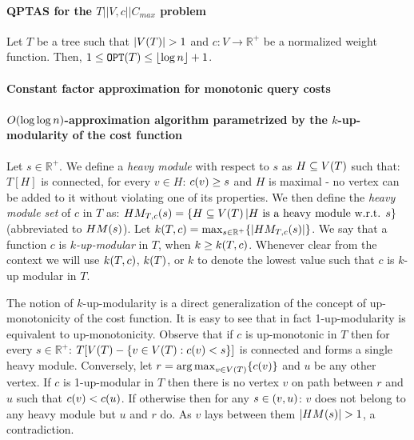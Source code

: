 \paragraph{QPTAS for the $T||V,c||C_{max}$ problem}
\begin{observation}\label{basicBoundsOnCost}
    Let $T$ be a tree such that $\spr{V\br{T}}> 1$ and $c:V\to \mathbb{R}^+$ be a normalized weight function. Then, $1\leq \texttt{OPT}(T) \leq \mathopen{}\left\lfloor \log n \right\rfloor+1$.
\end{observation}

\paragraph{Constant factor approximation for monotonic query costs}

\paragraph{$O\mathopen{}\left( \log\log n \right)$-approximation algorithm parametrized by the $k$-up-modularity of the cost function}

Let $s\in\mathbb{R}^+$. We define a \textit{heavy module} with respect to $s$ as $H\subseteq V\mathopen{}\left( T \right)$ such that: $T[H]$ is connected, for every $v \in H$: $c\mathopen{}\left( v \right)\geq s$ and $H$ is maximal - no vertex can be added to it without violating one of its properties. We then define the \textit{heavy module set} of $c$ in $T$ as: $HM_{T,c}\mathopen{}\left( s \right)=\mathopen{}\left\{ H\subseteq V\mathopen{}\left( T \right)|H \text{ is a heavy module w.r.t. } s \right\}$ (abbreviated to $HM\mathopen{}\left( s \right)$). Let $k\mathopen{}\left( T,c \right)= \max_{s\in\mathbb{R}^+}\mathopen{}\left\{ \mathopen{}\left| HM_{T,c}\mathopen{}\left( s \right) \right| \right\}$. We say that a function $c$ is $k$\textit{-up-modular} in $T$, when $k\geq k\mathopen{}\left( T,c \right)$. Whenever clear from the context we will use $k\mathopen{}\left( T,c \right)$, $k\mathopen{}\left( T \right)$, or $k$ to denote the lowest value such that $c$ is $k$-up modular in $T$. 

The notion of $k$-up-modularity is a direct generalization of the concept of up-monotonicity of the cost function. It is easy to see that in fact 1-up-modularity is equivalent to up-monotonicity. Observe that if $c$ is up-monotonic in $T$ then for every $s\in\mathbb{R}^+$: $T[V\mathopen{}\left( T \right)-\mathopen{}\left\{ v\in V\mathopen{}\left( T \right): c\mathopen{}\left( v \right)<s \right\}]$ is connected and forms a single heavy module. Conversely, let $r=\operatorname*{arg\,max}_{v\in V\mathopen{}\left( T \right)}\mathopen{}\left\{ c\mathopen{}\left( v \right) \right\}$ and $u$ be any other vertex. If $c$ is 1-up-modular in $T$ then there is no vertex $v$ on path between $r$ and $u$ such that $c\mathopen{}\left( v \right)<c\mathopen{}\left( u \right)$. If otherwise then for any $s\in \mathopen{}\left( v,u \right)$: $v$ does not belong to any heavy module but $u$ and $r$ do. As $v$ lays between them $\spr{HM\br{s}}>1$, a contradiction.

